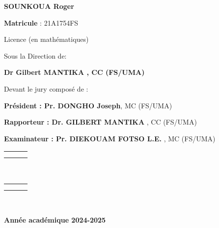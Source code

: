 \documentclass[a4paper, 14pt]{report}
\begin{document}
\begin{center}
{\begin{center}
\textbf{SOUNKOUA Roger}
\end{center}

\begin{center}
\textbf{Matricule }: 21A1754FS
\end{center}

\begin{center}
Licence (en mathématiques)
\end{center}

\begin{center}
Sous la Direction de:
\end{center}

\begin{center}
\textbf{ Dr Gilbert MANTIKA , CC (FS/UMA)}
\end{center}

	\vspace{0,5cm}	

Devant le jury composé de :
\begin{center}
	\textbf{Président : Pr. DONGHO Joseph},  MC (FS/UMA)
\end{center}
\begin{center}
	\textbf{ Rapporteur : Dr. GILBERT MANTIKA },  CC (FS/UMA)
\end{center}
\begin{center}
	\textbf{Examinateur : Pr. DIEKOUAM FOTSO L.E. }, MC (FS/UMA)
\end{center}

\begin{center}

\begin{tabularx}{\textwidth}{>{\centering}XcX<{\centering}}
	
	& & \\
	& & \\
	
\end{tabularx}\\


\begin{tabularx}{\textwidth}{>{\centering}XcX<{\centering}}
	
	& & \\
	& & \\
\end{tabularx}\

\textbf{Année académique 2024-2025}

\end{center} \thispagestyle{empty}
}

\normalsize




\end{center} \thispagestyle{empty}
\end{document}
